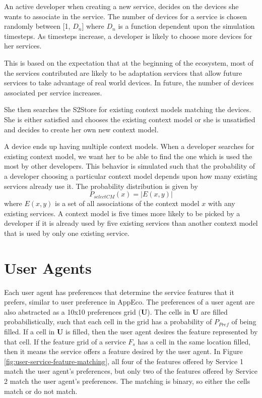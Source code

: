 An active developer when creating a new service, decides on the devices she wants to associate in the service. The number of devices for a service is chosen randomly between [1, $D_n$] where $D_n$ is a function dependent upon the simulation timesteps. As timesteps increase, a developer is likely to choose more devices for her services.

This is based on the expectation that at the beginning of the ecosystem, most of the services contributed are likely to be adaptation services that allow future services to take advantage of real world devices. In future, the number of devices associated per service increases.

She then searches the S2Store for existing context models matching the devices. She is either satisfied and chooses the existing context model or she is unsatisfied and decides to create her own new context model.

A device ends up having multiple context models. When a developer searches for existing context model, we want her to be able to find the one which is used the most by other developers. This behavior is simulated such that the probability of a developer choosing a particular context model depends upon how many existing services already use it. The probability distribution is given by $$P_{selectCM}(x)=\left\vert{E(x,y)}\right\vert$$ where $E(x,y)$ is a set of all associations of the context model $x$ with any existing services. A context model is five times more likely to be picked by a developer if it is already used by five existing services than another context model that is used by only one existing service.

\section{User Agents}

Each user agent has preferences that determine the service features that it prefers, similar to user preference in AppEco. The preferences of a user agent are also abstracted as a 10x10 preferences grid ($\textbf{U}$). The cells in $\textbf{U}$ are filled probabilistically, such that each cell in the grid has a probability of $P_{Pref}$ of being filled. If a cell in $\textbf{U}$ is filled, then the user agent desires the feature represented by that cell. If the feature grid of a service $F_s$ has a cell in the same location filled, then it means the service offers a feature desired by the user agent. In Figure \ref{fig:user-service-feature-matching}, all four of the features offered by Service 1 match the user agent's preferences, but only two of the features offered by Service 2 match the user agent's preferences. The matching is binary, so either the cells match or do not match.

